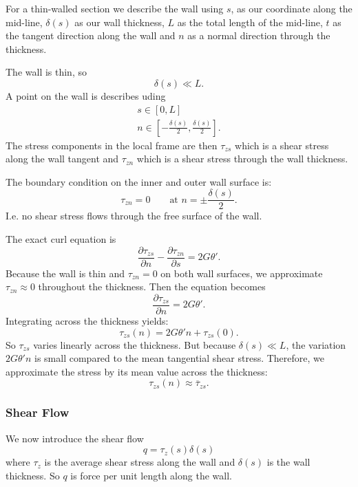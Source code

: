 For a thin-walled section we describe the wall using $s$, as our coordinate along the mid-line, $\delta(s)$ as our wall thickness, $L$ as the total length of the mid-line, $t$ as the tangent direction along the wall and $n$ as a normal direction through the thickness.

The wall is thin, so
\begin{equation*}
  \delta(s) \ll L
.\end{equation*}
A point on the wall is describes uding
\begin{gather*}
  s \in \left[ 0, L \right] \\
  n \in \left[ - \frac{\delta(s)}{2}, \frac{\delta(s)}{2} \right]
.\end{gather*}
The stress components in the local frame are then $\tau_{zs}$ which is a shear stress along the wall tangent and $\tau_{zn}$ which is a shear stress through the wall thickness.

The boundary condition on the inner and outer wall surface is:
\begin{equation*}
  \tau_{zn} = 0 \qquad \text{at }n = \pm \frac{\delta(s)}{2}
.\end{equation*}
I.e. no shear stress flows through the free surface of the wall.

The exact curl equation is
\begin{equation*}
  \frac{\partial \tau_{zs}}{\partial n} - \frac{\partial \tau_{zn}}{\partial s} = 2 G \theta'
.\end{equation*}
Because the wall is thin and $\tau_{zn} = 0$ on both wall surfaces, we approximate $\tau_{zn}\approx 0$ throughout the thickness.
Then the equation becomes
\begin{equation*}
  \frac{\partial \tau_{zs}}{\partial n}  = 2G \theta'
.\end{equation*}
Integrating across the thickness yields:
\begin{equation*}
  \tau_{zs}(n) = 2G\theta' n + \tau_{zs}(0)
.\end{equation*}
So $\tau_{zs}$ varies linearly across the thickness.
But because $\delta(s) \ll  L$, the variation $2 G \theta' n$ is small compared to the mean tangential shear stress.
Therefore, we approximate the stress by its mean value across the thickness:
\begin{equation*}
  \tau_{zs}(n) \approx \overline{\tau}_{zs}
.\end{equation*}

\subsubsection{Shear Flow}
We now introduce the shear flow
\begin{equation*}
  q = \tau_z (s) \delta(s)
\end{equation*}
where $\tau_z$ is the average shear stress along the wall and $\delta(s)$ is the wall thickness.
So $q$ is force per unit length along the wall.

